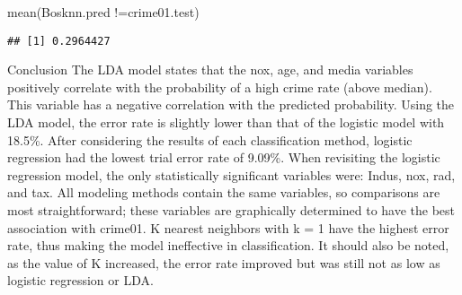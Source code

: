 \documentclass[
]{article}
\newenvironment{Shaded}{\begin{snugshade}}{\end{snugshade}}
\newcommand{\FunctionTok}[1]{\textcolor[rgb]{0.00,0.00,0.00}{#1}}
\newcommand{\NormalTok}[1]{#1}
\newcommand{\SpecialCharTok}[1]{\textcolor[rgb]{0.00,0.00,0.00}{#1}}
\begin{document}
\begin{Shaded}
\begin{Highlighting}[]
\FunctionTok{mean}\NormalTok{(Bosknn.pred }\SpecialCharTok{!=}\NormalTok{crime01.test)}
\end{Highlighting}
\end{Shaded}

\begin{verbatim}
## [1] 0.2964427
\end{verbatim}

Conclusion The LDA model states that the nox, age, and media variables
positively correlate with the probability of a high crime rate (above
median). This variable has a negative correlation with the predicted
probability. Using the LDA model, the error rate is slightly lower than
that of the logistic model with 18.5\%. After considering the results of
each classification method, logistic regression had the lowest trial
error rate of 9.09\%. When revisiting the logistic regression model, the
only statistically significant variables were: Indus, nox, rad, and tax.
All modeling methods contain the same variables, so comparisons are most
straightforward; these variables are graphically determined to have the
best association with crime01. K nearest neighbors with k = 1 have the
highest error rate, thus making the model ineffective in classification.
It should also be noted, as the value of K increased, the error rate
improved but was still not as low as logistic regression or LDA.
\end{document}
